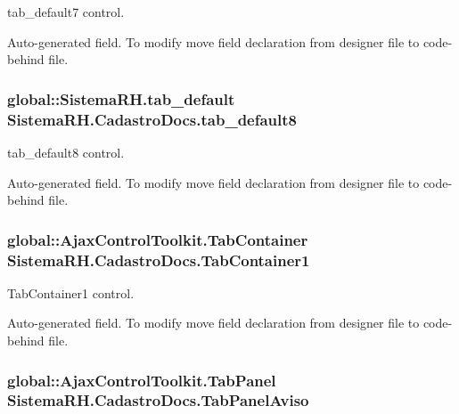 tab\_\-default7 control. 

Auto-\/generated field. To modify move field declaration from designer file to code-\/behind file. \hypertarget{class_sistema_r_h_1_1_cadastro_docs_ac30c963cac5d90c4389fa02d973437c8}{
\subsubsection[{tab\_\-default8}]{\setlength{\rightskip}{0pt plus 5cm}global::SistemaRH.tab\_\-default {\bf SistemaRH.CadastroDocs.tab\_\-default8}}}
\label{class_sistema_r_h_1_1_cadastro_docs_ac30c963cac5d90c4389fa02d973437c8}


tab\_\-default8 control. 

Auto-\/generated field. To modify move field declaration from designer file to code-\/behind file. \hypertarget{class_sistema_r_h_1_1_cadastro_docs_ae16b8fe37c2be10be0e70b2d50292d54}{
\subsubsection[{TabContainer1}]{\setlength{\rightskip}{0pt plus 5cm}global::AjaxControlToolkit.TabContainer {\bf SistemaRH.CadastroDocs.TabContainer1}}}
\label{class_sistema_r_h_1_1_cadastro_docs_ae16b8fe37c2be10be0e70b2d50292d54}


TabContainer1 control. 

Auto-\/generated field. To modify move field declaration from designer file to code-\/behind file. \hypertarget{class_sistema_r_h_1_1_cadastro_docs_a386a760852dcd8ea7a3e45918086593f}{
\subsubsection[{TabPanelAviso}]{\setlength{\rightskip}{0pt plus 5cm}global::AjaxControlToolkit.TabPanel {\bf SistemaRH.CadastroDocs.TabPanelAviso}}}
\label{class_sistema_r_h_1_1_cadastro_docs_a386a760852dcd8ea7a3e45918086593f}


